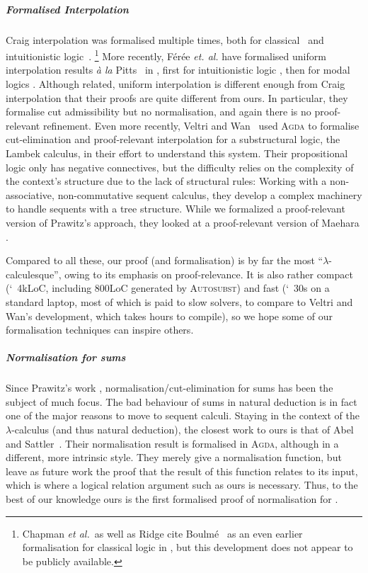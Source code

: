 \documentclass[a4paper,UKenglish,cleveref, autoref, thm-restate]{lipics-v2021}
\begin{document}
\subparagraph*{Formalised Interpolation}
Craig interpolation was formalised multiple times, both for classical~\cite{Ridge2006,michaelis_et_al2017} and intuitionistic logic~\cite{ChapmanMU08}.%
\footnote{Chapman {\it et al.}\ as well as Ridge cite Boulmé~\cite{Boulme1996}
as an even earlier formalisation for classical logic in \Rocq,
but this development does not appear to be publicly available.}
%
More recently, Férée \textit{et. al.}
have formalised uniform interpolation results {\it à la} Pitts~\cite{Pitts92}
in \Rocq,
first for intuitionistic logic \cite{Feree2023}, then for modal logics
\cite{Feree2024}. Although related, uniform interpolation is different enough
from Craig interpolation that their proofs are quite different from ours. In particular,
they formalise cut admissibility but no normalisation, and again there
is no proof-relevant refinement. Even more recently, Veltri and Wan~\cite{VeltriW25}
used \textsc{Agda} to formalise cut-elimination and proof-relevant interpolation 
for a substructural logic, the Lambek calculus, in their effort to understand this system.
Their propositional logic only
has negative connectives, but the difficulty relies on the complexity of
the context's structure due to the lack of structural rules:
Working with a non-associative, non-commutative sequent calculus, they develop a complex machinery to handle sequents with a tree structure.
While we formalized a proof-relevant version of Prawitz's approach,
they looked at a proof-relevant version of Maehara \cite{Maehara}. 

Compared to all these, our proof (and formalisation) is by far the most
``\(\lambda\)-calculesque'', owing to its emphasis on proof-relevance.
It is also rather compact (\char`~4kLoC, including 800LoC generated by \textsc{Autosubst})
and fast (\char`~30s on a standard laptop,
most of which is paid to slow solvers, to compare to Veltri and Wan's development,
which takes hours to compile), so we hope some of our formalisation techniques
can inspire others.

\subparagraph*{Normalisation for sums}
Since Prawitz's work \cite{Prawitz1965-PRANDA},
normalisation/cut-elimination for sums has been the subject of much
focus. The bad behaviour of sums in natural deduction is in fact
one of the major reasons to move to sequent calculi.
Staying in the context of the \(\lambda\)-calculus (and thus natural
deduction), the closest work to ours is that of Abel and Sattler~\cite{Abel2019a}.
Their normalisation result is formalised in \textsc{Agda}, although in a
different, more intrinsic style. They merely give a
normalisation function, but leave as future work the proof that the
result of this function relates to its input, which is where a logical
relation argument such as ours is necessary. Thus, to the best of our
knowledge ours is the first formalised proof of normalisation for \stlcp.
\end{document}
